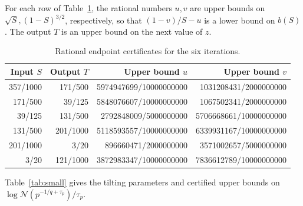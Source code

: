 \documentclass[11pt,a4paper]{article}
\begin{document}
For each row of Table~\ref{tab:bootstrap}, the rational numbers \(u,v\)
are upper bounds on \(\sqrt S,(1-S)^{3/2}\), respectively, so that
\((1-v)/S-u\) is a lower bound on \(b(S)\). The output \(T\) is an
upper bound on the next value of \(z\).

\begin{table}[htbp]
\centering
\small
\caption{Rational endpoint certificates for the six iterations.}
\label{tab:bootstrap}
\begin{tabular}{@{}rrrr@{}}
\toprule
Input \(S\) & Output \(T\) & Upper bound \(u\) & Upper bound \(v\)\\
\midrule
357/1000 & 171/500 & 5974947699/10000000000 & 1031208431/2000000000 \\
171/500 & 39/125 & 5848076607/10000000000 & 1067502341/2000000000 \\
39/125 & 131/500 & 2792848009/5000000000 & 5706668661/10000000000 \\
131/500 & 201/1000 & 5118593557/10000000000 & 6339931167/10000000000 \\
201/1000 & 3/20 & 896660471/2000000000 & 3571002657/5000000000 \\
3/20 & 121/1000 & 3872983347/10000000000 & 7836612789/10000000000 \\
\bottomrule
\end{tabular}
\end{table}

Table~\ref{tab:small} gives the tilting parameters and certified
upper bounds on \(\log\mathcal N(p^{-1/q+\tau_p})/\tau_p\).
\end{document}
